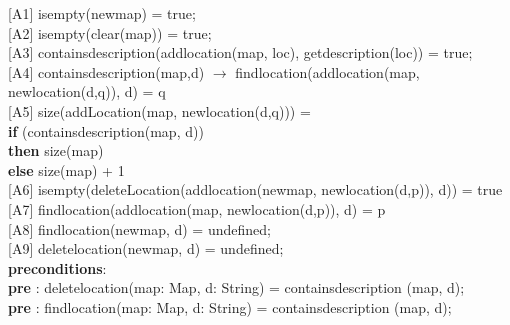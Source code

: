 \documentclass[12pt]{article}
\begin{document}
\begin{spacing}{1.5}
\hspace*{5mm} [A1] isempty(newmap) = true;\\
\hspace*{5mm} [A2] isempty(clear(map)) = true;\\
\hspace*{5mm} [A3] containsdescription(addlocation(map, loc), getdescription(loc)) = true;\\
\hspace*{5mm} [A4] containsdescription(map,d) $\rightarrow$ findlocation(addlocation(map, newlocation(d,q)), d) \hspace*{15mm} = q \\
\hspace*{5mm} [A5] size(addLocation(map, newlocation(d,q))) = \\ \hspace*{15mm} \textbf{if} (containsdescription(map, d)) \\ \hspace*{25mm}\textbf{then} size(map) \\ \hspace*{15mm} \textbf{else} size(map) + 1\\
\hspace*{5mm} [A6] isempty(deleteLocation(addlocation(newmap, newlocation(d,p)), d)) = true \\
\hspace*{5mm} [A7] findlocation(addlocation(map, newlocation(d,p)), d) = p\\
\hspace*{5mm} [A8] findlocation(newmap, d) = undefined;\\
\hspace*{5mm} [A9] deletelocation(newmap, d) = undefined;\\
\hspace*{5mm} \textbf{preconditions}:\\
\hspace*{10mm} \textbf{pre} : deletelocation(map: Map, d: String) = containsdescription (map, d);\\
\hspace*{10mm} \textbf{pre} : findlocation(map: Map, d: String) = containsdescription (map, d);\\
\end{spacing}
\end{document}
